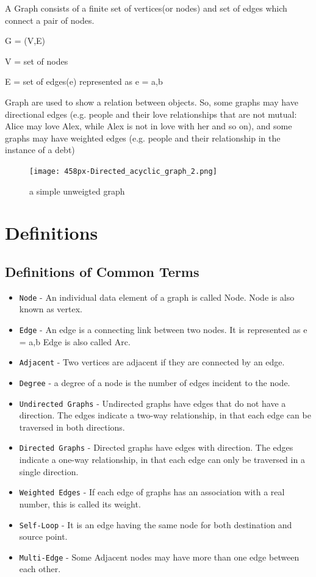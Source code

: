 \documentclass[12pt]{article}
\begin{document}
A Graph consists of a finite set of vertices(or nodes) and set of edges which connect a pair of nodes. 

G = (V,E)

V = set of nodes

E = set of edges(e) represented as e = {a,b}

Graph are used to show a relation between objects. So, some graphs may have directional edges (e.g. people and their love relationships that are not mutual: Alice may love Alex, while Alex is not in love with her and so on), and some graphs may have weighted edges (e.g. people and their relationship in the instance of a debt)

\begin{figure}[h]
\centering
  \texttt{[image: 458px-Directed\_acyclic\_graph\_2.png]}
  
\caption{a simple unweigted graph}
\end{figure}

\section{Definitions}
    \subsection{Definitions of Common Terms}
        \begin{itemize}
          \item \texttt{Node} - An individual data element of a graph is called Node. Node is also known as vertex.
          \item \texttt{Edge} - An edge is a connecting link between two nodes. It is represented as e = {a,b} Edge is also called Arc. 
          \item \texttt{Adjacent} - Two vertices are adjacent if they are connected by an edge.
          \item \texttt{Degree} - a degree of a node is the number of edges incident to the node.  
          \item \texttt{Undirected Graphs} - Undirected graphs have edges that do not have a direction. The edges indicate a two-way relationship, in that each edge can be traversed in both directions.  
          \item \texttt{Directed Graphs} - Directed graphs have edges with direction. The edges indicate a one-way relationship, in that each edge can only be traversed in a single direction.  
          \item \texttt{Weighted Edges} - If each edge of graphs has an association with a real number, this is called its weight. 
          \item \texttt{Self-Loop} - It is an edge having the same node for both destination and source point.
          \item \texttt{Multi-Edge} - Some Adjacent nodes may have more than one edge between each other.
          
    
        \end{itemize}
        \newpage
\end{document}
